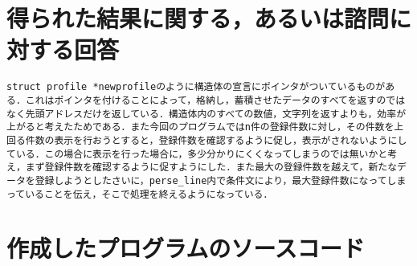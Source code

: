 \documentclass[a4j]{jarticle}
\begin{document}
%
%

\section{得られた結果に関する，あるいは諮問に対する回答}

\begin{verbatim}
struct profile *newprofileのように構造体の宣言にポインタがついているものがある．これはポインタを付けることによって，格納し，蓄積させたデータのすべてを返すのではなく先頭アドレスだけを返している．構造体内のすべての数値，文字列を返すよりも，効率が上がると考えたためである．また今回のプログラムではn件の登録件数に対し，その件数を上回る件数の表示を行おうとすると，登録件数を確認するように促し，表示がされないようにしている．この場合に表示を行った場合に，多少分かりにくくなってしまうのでは無いかと考え，まず登録件数を確認するように促すようにした．また最大の登録件数を越えて，新たなデータを登録しようとしたさいに，perse_line内で条件文により，最大登録件数になってしまっていることを伝え，そこで処理を終えるようになっている．
\end{verbatim}

\newpage

%
%

\section{作成したプログラムのソースコード}
\end{document}

